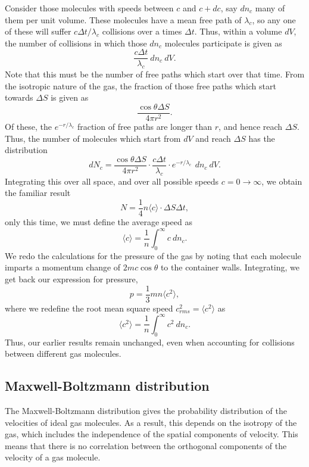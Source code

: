 \documentclass[11pt]{article}
\newcommand\E[1]{\langle #1 \rangle}
\theoremstyle{definition}
\theoremstyle{remark}
\numberwithin{equation}{section}
\begin{document}
    Consider those molecules with speeds between $c$ and $c + dc$, say $dn_c$ many
    of them per unit volume. These molecules have a mean free path of $\lambda_c$,
    so any one of these will suffer $c \Delta t/ \lambda_c$ collisions over a times
    $\Delta t$. Thus, within a volume $dV$, the number of collisions in which those
    $dn_c$ molecules participate is given as \[
        \frac{c \Delta t}{\lambda_c} \:dn_c\:dV.
    \] Note that this must be the number of free paths which start over that time.
    From the isotropic nature of the gas, the fraction of those free paths which
    start towards $\Delta S$ is given as \[
        \frac{\cos\theta \Delta S}{4\pi r^2}.
    \] Of these, the $e^{- r / \lambda_c}$ fraction of free paths are longer than
    $r$, and hence reach $\Delta S$. Thus, the number of molecules which start from
    $dV$ and reach $\Delta S$ has the distribution \[
        dN_c = \frac{\cos\theta \Delta S}{4\pi r^2}\cdot \frac{c\Delta
        t}{\lambda_c}\cdot e^{-r / \lambda_c}\,\:dn_c\:dV.
    \] Integrating this over all space, and over all possible speeds $c = 0 \to
    \infty$, we obtain the familiar result \[
        N = \frac{1}{4}n\E{c} \cdot \Delta S\Delta t,
    \] only this time, we must define the average speed as \[
        \E{c} = \frac{1}{n}\int_0^\infty c\:dn_c.
    \] We redo the calculations for the pressure of the gas by noting that each
    molecule imparts a momentum change of $2mc\cos\theta$ to the container walls.
    Integrating, we get back our expression for pressure, \[
        p = \frac{1}{3}mn\E{c^2},
    \] where we redefine the root mean square speed $c_{rms}^2 = \E{c^2}$ as \[
        \E{c^2} = \frac{1}{n}\int_0^\infty c^2\:dn_c.
    \] Thus, our earlier results remain unchanged, even when accounting for
    collisions between different gas molecules.
    

    \subsection{Maxwell-Boltzmann distribution}
    The Maxwell-Boltzmann distribution gives the probability distribution of the
    velocities of ideal gas molecules. As a result, this depends on the isotropy of
    the gas, which includes the independence of the spatial components of velocity.
    This means that there is no correlation between the orthogonal components of the
    velocity of a gas molecule.
\end{document}

